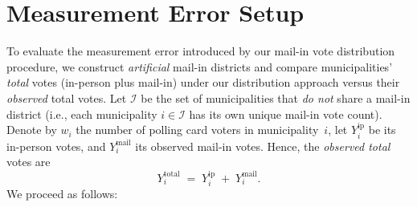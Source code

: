 \documentclass[12pt]{article}
\newcommand{\ip}{\text{ip}}
\newcommand{\mail}{\text{mail}}
\newcommand{\total}{\text{total}}
\begin{document}
\section{Measurement Error Setup}

To evaluate the measurement error introduced by our mail-in vote distribution procedure, we construct \emph{artificial} mail-in districts and compare municipalities’ \emph{total} votes (in-person plus mail-in) under our distribution approach versus their \emph{observed} total votes. Let $\mathcal{I}$ be the set of municipalities that \emph{do not} share a mail-in district (i.e., each municipality $i \in \mathcal{I}$ has its own unique mail-in vote count). Denote by $w_i$ the number of polling card voters in municipality~$i$, let $Y_i^{\ip}$ be its in-person votes, and $Y_i^{\mail}$ its observed mail-in votes. Hence, the \emph{observed total} votes are 
\[
    Y_i^{\total} \;=\; Y_i^{\ip} \;+\; Y_i^{\mail}.
\]
We proceed as follows:
\end{document}
